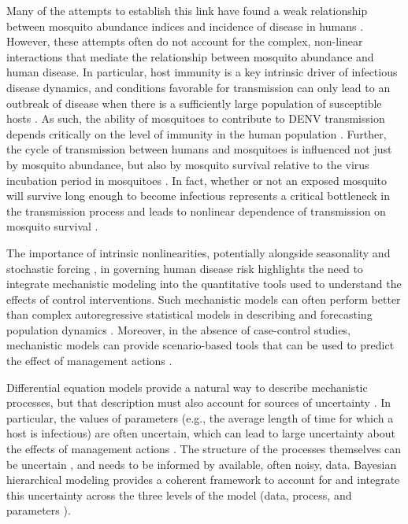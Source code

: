 \documentclass[10pt,letterpaper]{article}
\begin{document}
Many of the attempts to establish this link have found a weak relationship between mosquito abundance indices and incidence of disease in humans \cite{Bowman2014, Pepin2015, Cromwell2017}.
However, these attempts often do not account for the complex, non-linear interactions that mediate the relationship between mosquito abundance and human disease.
In particular, host immunity is a key intrinsic driver of infectious disease dynamics, and conditions favorable for transmission can only lead to an outbreak of disease when there is a sufficiently large population of susceptible hosts \cite{Koelle2004, Koelle2005}.
As such, the ability of mosquitoes to contribute to DENV transmission depends critically on the level of immunity in the human population \cite{Scott2010a}.
Further, the cycle of transmission between humans and mosquitoes is influenced not just by mosquito abundance, but also by mosquito survival relative to the virus incubation period in mosquitoes \cite{Smith2012}.
In fact, whether or not an exposed mosquito will survive long enough to become infectious represents a critical bottleneck in the transmission process and leads to nonlinear dependence of transmission on mosquito survival \cite{Smith2012}.

The importance of intrinsic nonlinearities, potentially alongside seasonality and stochastic forcing \cite{Ellner1998, Koelle2004, Grenfell2002}, in governing human disease risk highlights the need to integrate mechanistic modeling into the quantitative tools used to understand the effects of control interventions.
Such mechanistic models can often perform better than complex autoregressive statistical models in describing and forecasting population dynamics \cite{Reilly2005}.
Moreover, in the absence of case-control studies, mechanistic models can provide scenario-based tools that can be used to predict the effect of management actions \cite{Buckland2007}.

Differential equation models provide a natural way to describe mechanistic processes, but that description must also account for sources of uncertainty \cite{Hotelling1927, Wikle2010}.
In particular, the values of parameters (e.g., the average length of time for which a host is infectious) are often uncertain, which can lead to large uncertainty about the effects of management actions \cite{Elderd2006}.
The structure of the processes themselves can be uncertain \cite{Ellner1998}, and needs to be informed by available, often noisy, data.
Bayesian hierarchical modeling provides a coherent framework to account for and integrate this uncertainty across the three levels of the model (data, process, and parameters \cite{Berliner1996, Cressie2009}).
\end{document}
